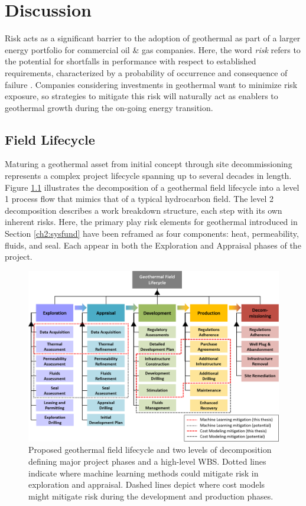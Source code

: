 \chapter{Discussion}\label{ch7:discuss}
\label{ch7:discussion}

Risk acts as a significant barrier to the adoption of geothermal as part of a larger energy portfolio for commercial oil \& gas companies. Here, the word \textit{risk} refers to the potential for shortfalls in performance with respect to established requirements, characterized by a probability of occurrence and consequence of failure \citep{nasa_s3001_2017, malone_development_2004}.  Companies considering investments in geothermal want to minimize risk exposure, so strategies to mitigate this risk will naturally act as enablers to geothermal growth during the on-going energy transition.

\section{Field Lifecycle}
\label{ch7:field_lifecycle}

Maturing a geothermal asset from initial concept through site decommissioning represents a complex project lifecycle spanning up to several decades in length. Figure \ref{fig:geothermal_field_lifecycle} illustrates the decomposition of a geothermal field lifecycle into a level 1 process flow that mimics that of a typical hydrocarbon field. The level 2 decomposition describes a work breakdown structure, each step with its own inherent risks. Here, the primary play risk elements for geothermal introduced in Section \ref{ch2:sysfund} have been reframed as four components: heat, permeability, fluids, and seal. Each appear in both the Exploration and Appraisal phases of the project. 

\begin{figure}
\centering
\includegraphics[width=\textwidth]{templates/images/Figure-SystemDecomposition.png}
\caption[Geothermal field lifecycle]{Proposed geothermal field lifecycle and two levels of decomposition defining major project phases and a high-level WBS. Dotted lines indicate where machine learning methods could mitigate risk in exploration and appraisal. Dashed lines depict where cost models might mitigate risk during the development and production phases.}
\label{fig:geothermal_field_lifecycle}
\end{figure}

